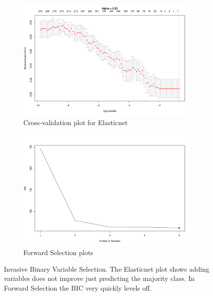 \documentclass{article}
\begin{document}
\begin{figure}[h!]
\begin{subfigure}[b]{0.5\textwidth}
\includegraphics[width=\textwidth]{elastic_cv_invasive_binary.pdf}
\caption{Cross-validation plot for Elasticnet}
\end{subfigure}
\hfill
\begin{subfigure}[b]{0.5\textwidth}
\includegraphics[width=\textwidth]{forward_nvars_invasive_binary.pdf}
\caption{Forward Selection plots}
\end{subfigure}
\caption{Invasive Binary Variable Selection. The Elasticnet plot shows adding variables does not improve just predicting the majority class. In Forward Selection the BIC very quickly levels off.}
\label{figure:invasive_binary_opt}
\end{figure}
\end{document}
